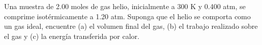 \item Una muestra de 2.00 moles de gas helio, inicialmente a 300 K y 0.400 atm, se comprime isotérmicamente a 1.20 atm. Suponga que el helio se comporta como un gas ideal, encuentre (a) el volumen final del gas, (b) el trabajo realizado sobre el gas y (c) la energía transferida por calor.
